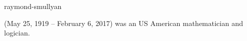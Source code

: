\documentclass{stex}
\begin{document}
\begin{smodule}{raymond-smullyan}
\begin{sparagraph}[style=symdoc]
   (May 25, 1919 – February 6, 2017) was an US American mathematician and logician.
\end{sparagraph}
\end{smodule}
\end{document}

